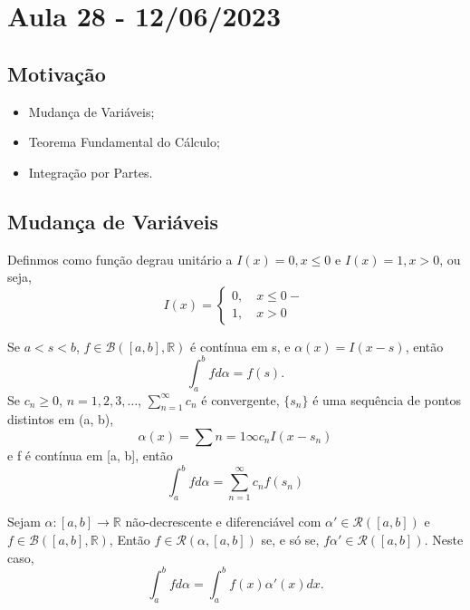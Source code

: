\documentclass[analysis_notes.tex]{subfiles}
\begin{document}
\section{Aula 28 - 12/06/2023}
\subsection{Motivação}
\begin{itemize}
	\item Mudança de Variáveis;
	\item Teorema Fundamental do Cálculo;
	\item Integração por Partes.
\end{itemize}
\subsection{Mudança de Variáveis}
Definmos como função degrau unitário a \(I(x)=0, x\leq 0\) e \(I(x)=1, x > 0\), ou seja,
\[
	I(x) = \left\{\begin{array}{ll}
		0, \quad x \leq 0- \\
		1, \quad x > 0
	\end{array}\right.
\]
\begin{theorem*}
	Se \(a < s < b\), \(f\in \mathcal{B}([a, b], \mathbb{R}) \) é contínua em s, e \(\alpha (x)=I(x-s)\), então
	\[
		\int_{a}^{b}f d \alpha = f(s).
	\]
	Se \(c_{n}\geq 0\), \(n=1, 2, 3, \dotsc \), \(\sum\limits_{n=1}^{\infty}c_{n}\) é convergente, \(\{s_{n}\}\) é uma sequência de pontos distintos em (a, b),
	\[
		\alpha (x)= \sum{n=1}{\infty}c_{n}I(x-s_{n})
	\]
	e f é contínua em [a, b], então
	\[
		\int_{a}^{b}f d \alpha = \sum\limits_{n=1}^{\infty}c_{n}f(s_{n})
	\]
\end{theorem*}
\begin{theorem*}
	Sejam \(\alpha : [a, b]\rightarrow \mathbb{R}\) não-decrescente e diferenciável com \(\alpha '\in \mathcal{R}([a, b])\) e \(f\in \mathcal{B}([a, b], \mathbb{R})\), Então \(f\in \mathcal{R}(\alpha , [a, b]) \) se, e só se, \(f \alpha '\in \mathcal{R}([a, b])\).
	Neste caso,
	\[
		\int_{a}^{b}f d \alpha = \int_{a}^{b} f(x)\alpha '(x)dx.
	\]
\end{theorem*}
\end{document}
